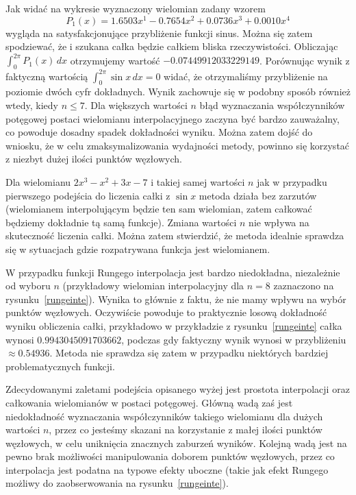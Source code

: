 \documentclass[11pt,wide,leqno]{article}
\begin{document}
        Jak widać na wykresie wyznaczony wielomian zadany wzorem
        \begin{equation}
            P_1(x) = 1.6503x^1 - 0.7654x^2 + 0.0736x^3 + 0.0010x^4
        \end{equation}
        wygląda na satysfakcjonujące przybliżenie funkcji sinus. Można się zatem spodziewać, że i szukana całka będzie całkiem bliska rzeczywistości.
        Obliczając \(\int_{0}^{2\pi} P_1(x)\,dx\) otrzymujemy wartość \(-0.07449912033229149\). Porównując wynik 
        z faktyczną wartością \(\int_{0}^{2\pi} \sin x \,dx = 0\) widać, że otrzymaliśmy
        przybliżenie na poziomie dwóch cyfr dokładnych. Wynik zachowuje się w podobny sposób również wtedy, kiedy
        \(n \leq 7\). Dla większych wartości \(n\) błąd wyznaczania współczynników potęgowej postaci wielomianu
        interpolacyjnego zaczyna być bardzo zauważalny, co powoduje dosadny spadek dokładności wyniku. Można zatem dojść do wniosku, że 
        w celu zmaksymalizowania wydajności metody, powinno się korzystać z niezbyt dużej ilości punktów węzłowych.

        Dla wielomianu \(2x^3 - x^2 + 3x - 7\) i takiej samej wartości \(n\) jak w przypadku pierwszego podejścia do liczenia całki z \(\sin x\) metoda działa bez zarzutów
        (wielomianem interpolującym będzie ten sam wielomian, zatem całkować będziemy dokładnie tą samą funkcje).
        Zmiana wartości \(n\) nie wpływa na skuteczność liczenia całki. Można zatem stwierdzić, że metoda idealnie sprawdza się w sytuacjach
        gdzie rozpatrywana funkcja jest wielomianem.

        W przypadku funkcji Rungego interpolacja jest bardzo niedokładna, niezależnie od wyboru \(n\) (przykładowy 
        wielomian interpolacyjny dla \(n=8\) zaznaczono na rysunku~\ref{rungeinte}).
        Wynika to głównie z faktu, że nie mamy wpływu na wybór punktów węzłowych. Oczywiście powoduje to 
        praktycznie losową dokładność wyniku obliczenia całki, przykładowo w przykładzie z 
        rysunku~\ref{rungeinte} całka wynosi \(0.9943045091703662\), podczas gdy faktyczny wynik wynosi 
        w przybliżeniu \(\approx 0.54936\). Metoda nie sprawdza się zatem w przypadku
        niektórych bardziej problematycznych funkcji. 

        Zdecydowanymi zaletami podejścia opisanego wyżej jest prostota interpolacji oraz 
        całkowania wielomianów w postaci potęgowej. Główną wadą zaś jest niedokładność wyznaczania 
        współczynników takiego wielomianu dla dużych wartości \(n\), przez co jesteśmy skazani
        na korzystanie z małej ilości punktów węzłowych, w celu uniknięcia znacznych zaburzeń wyników.
        Kolejną wadą jest na pewno brak możliwości manipulowania doborem punktów węzłowych, przez co interpolacja jest 
        podatna na typowe efekty uboczne (takie jak efekt Rungego możliwy do zaobserwowania na rysunku~\ref{rungeinte}).
\end{document}
